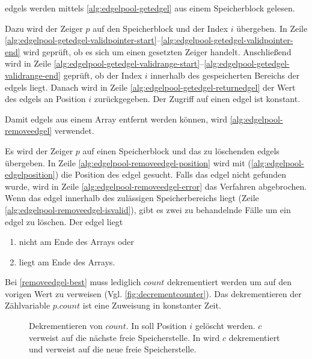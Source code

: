 \glspl{edgel} werden mittels \autoref{alg:edgelpool-getedgel} aus einem Speicherblock gelesen.

Dazu wird der Zeiger $p$ auf den Speicherblock und der Index $i$ übergeben. In Zeile
 \ref{alg:edgelpool-getedgel-validpointer-start}--\ref{alg:edgelpool-getedgel-validpointer-end} wird geprüft, ob es
 sich um einen gesetzten Zeiger handelt. Anschließend wird in Zeile
 \ref{alg:edgelpool-getedgel-validrange-start}--\ref{alg:edgelpool-getedgel-validrange-end} geprüft, ob der Index $i$
 innerhalb des gespeicherten Bereichs der \glspl{edgel} liegt. Danach wird in Zeile
 \ref{alg:edgelpool-getedgel-returnedgel} der Wert des \glspl{edgel} an Position $i$ zurückgegeben. Der Zugriff auf
 einen \gls{edgel} ist konstant.

Damit \glspl{edgel} aus einem Array entfernt werden können, wird \autoref{alg:edgelpool-removeedgel} verwendet.

Es wird der Zeiger $p$ auf einen Speicherblock und das zu löschenden \glspl{edgel} übergeben. In Zeile
 \ref{alg:edgelpool-removeedgel-position} wird mit  (\autoref{alg:edgelpool-edgelposition}) die
 Position des \gls{edgel} gesucht. Falls das \gls{edgel} nicht gefunden wurde, wird in Zeile
 \ref{alg:edgelpool-removeedgel-error} das Verfahren abgebrochen. Wenn das \gls{edgel} innerhalb des zulässigen
 Speicherbereichs liegt (Zeile \ref{alg:edgelpool-removeedgel-isvalid}), gibt es zwei zu behandelnde Fälle um ein
 \gls{edgel} zu löschen. Der \gls{edgel} liegt
\begin{enumerate}
	\item nicht am Ende des Arrays oder \label{removeedgel-worst}
	\item liegt am Ende des Arrays. \label{removeedgel-best}
\end{enumerate}
Bei \autoref{removeedgel-best} muss lediglich $\mathit{count}$ dekrementiert werden um auf den vorigen Wert zu
 verweisen (Vgl. \autoref{fig:decrementcounter}). Das dekrementieren der Zählvariable $\mathit{p.count}$ ist eine
 Zuweisung in konstanter Zeit.
\begin{figure}[!ht]
	\centering
	\subfigure[]{
		
		\label{fig:decrementcounter-before}
	}
	\subfigure[]{
		
		\label{fig:decrementcounter-after}
	}
	\caption{Dekrementieren von $\mathit{count}$. In  soll Position $i$ gelöscht
	 werden. $c$ verweist auf die nächste freie Speicherstelle. In  wird $c$
	 dekrementiert und verweist auf die neue freie Speicherstelle.}
	\label{fig:decrementcounter}
\end{figure}
